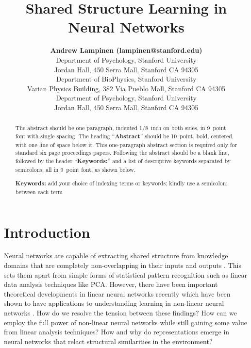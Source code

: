 \documentclass[10pt,letterpaper]{article}
\title{Shared Structure Learning in Neural Networks}
\author{{\large \bf Andrew Lampinen (lampinen@stanford.edu)} \\
  Department of Psychology, Stanford University \\
  Jordan Hall, 450 Serra Mall, Stanford CA 94305 
  \AND {\large \bf Shaw Hsu (cshawhsu@stanford.edu)} \\
  Department of BioPhysics, Stanford University \\
  Varian Physics Building, 382 Via Pueblo Mall, Stanford CA 94305
  \AND {\large \bf James L. McClelland (mcclelland@stanford.edu)} \\
  Department of Psychology, Stanford University \\
  Jordan Hall, 450 Serra Mall, Stanford CA 94305}
\begin{document}
\maketitle


\begin{abstract}
The abstract should be one paragraph, indented 1/8~inch on both sides,
in 9~point font with single spacing. The heading ``{\bf Abstract}''
should be 10~point, bold, centered, with one line of space below
it. This one-paragraph abstract section is required only for standard
six page proceedings papers. Following the abstract should be a blank
line, followed by the header ``{\bf Keywords:}'' and a list of
descriptive keywords separated by semicolons, all in 9~point font, as
shown below.

\textbf{Keywords:} 
add your choice of indexing terms or keywords; kindly use a
semicolon; between each term
\end{abstract}


\section{Introduction}
Neural networks are capable of extracting shared structure from knowledge domains that are completely non-overlapping in their inputs and outputs \citep{Hinton1986}. This sets them apart from simple forms of statistical pattern recognition \citep{Rogers2008} such as linear data analysis techniques like PCA. However, there have been important theoretical developments in linear neural networks recently which have been shown to have applications to understanding learning in non-linear neural networks \citep{Saxe2013}. How do we resolve the tension between these findings? How can we employ the full power of non-linear neural networks while still gaining some value from linear analysis techniques? How and why do representations emerge in neural networks that relact structural similarities in the environment? \par 
\end{document}
